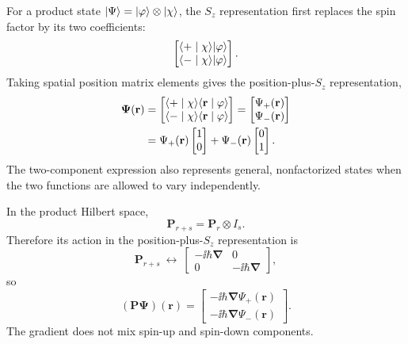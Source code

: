For a product state $\lvert \Psi\rangle=\lvert \varphi\rangle\otimes\lvert \chi\rangle$,
the $S_z$ representation first replaces the spin factor by its two
coefficients:
\[
 \begin{bmatrix}
  \langle +\mid \chi\rangle\lvert \varphi\rangle\\
  \langle -\mid \chi\rangle\lvert \varphi\rangle
 \end{bmatrix}.
\]
Taking spatial position matrix elements gives the position-plus-$S_z$
representation,
\begin{align*}
 \boldsymbol\Psi(\mathbf r)
 &=\begin{bmatrix}
   \langle +\mid \chi\rangle\langle \mathbf r\mid \varphi\rangle\\
   \langle -\mid \chi\rangle\langle \mathbf r\mid \varphi\rangle
  \end{bmatrix}
 =\begin{bmatrix}\Psi_+(\mathbf r)\\\Psi_-(\mathbf r)\end{bmatrix}\\
 &=\Psi_+(\mathbf r)\begin{bmatrix}1\\0\end{bmatrix}
  +\Psi_-(\mathbf r)\begin{bmatrix}0\\1\end{bmatrix}.
\end{align*}
The two-component expression also represents general, nonfactorized
states when the two functions are allowed to vary independently.

In the product Hilbert space,
\[
 \mathbf P_{r+s}=\mathbf P_r\otimes I_s.
\]
Therefore its action in the position-plus-$S_z$ representation is
\[
 \mathbf P_{r+s}\ \longleftrightarrow\
 \begin{bmatrix}
  -\ii\hbar\boldsymbol\nabla&0\\
  0&-\ii\hbar\boldsymbol\nabla
 \end{bmatrix},
\]
so
\[
 (\mathbf P\boldsymbol\Psi)(\mathbf r)=
 \begin{bmatrix}
  -\ii\hbar\boldsymbol\nabla\Psi_+(\mathbf r)\\
  -\ii\hbar\boldsymbol\nabla\Psi_-(\mathbf r)
 \end{bmatrix}.
\]
The gradient does not mix spin-up and spin-down components.
